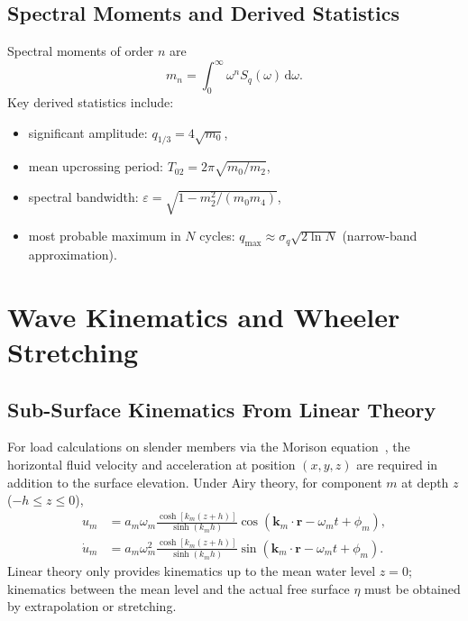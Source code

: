 \documentclass[journal,10pt,twocolumn]{IEEEtran}
\newcommand{\dd}{\,\mathrm{d}}
\newcommand{\vect}[1]{\bm{#1}}
\begin{document}
    \subsection{Spectral Moments and Derived Statistics}
    \label{sec:moments}

    Spectral moments of order $n$ are
    \begin{equation}
        m_n = \int_0^\infty \omega^n S_q(\omega)\dd\omega.
    \end{equation}
    Key derived statistics include:
    \begin{itemize}[leftmargin=1.2em]
        \item significant amplitude: $q_{1/3} = 4\sqrt{m_0}$,
        \item mean upcrossing period: $T_{02} = 2\pi\sqrt{m_0/m_2}$,
        \item spectral bandwidth: $\varepsilon = \sqrt{1 - m_2^2/(m_0 m_4)}$,
        \item most probable maximum in $N$ cycles: $q_{\max}\approx\sigma_q\sqrt{2\ln N}$
        (narrow-band approximation).
    \end{itemize}

    \section{Wave Kinematics and Wheeler Stretching}
    \label{sec:stretching}

    \subsection{Sub-Surface Kinematics From Linear Theory}
    \label{sec:kinematics}

    For load calculations on slender members via the Morison equation~\cite{Morison}, the
    horizontal fluid velocity and acceleration at position $(x,y,z)$ are required in
    addition to the surface elevation.
    Under Airy theory, for component $m$ at depth $z$ ($-h\le z\le0$),
    \begin{align}
        u_m &= a_m\omega_m
        \frac{\cosh[k_m(z+h)]}{\sinh(k_m h)}
        \cos(\vect{k}_m\cdot\vect{r}-\omega_m t+\phi_m), \\
        \dot{u}_m &= a_m\omega_m^2
        \frac{\cosh[k_m(z+h)]}{\sinh(k_m h)}
        \sin(\vect{k}_m\cdot\vect{r}-\omega_m t+\phi_m).
        \label{eq:kinematics}
    \end{align}
    Linear theory only provides kinematics up to the mean water level $z=0$; kinematics
    between the mean level and the actual free surface $\eta$ must be obtained by
    extrapolation or stretching.
\end{document}
